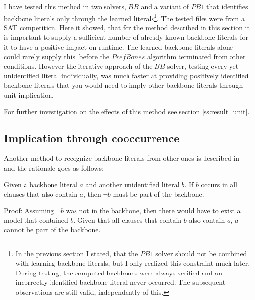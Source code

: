 I have tested this method in two solvers, $BB$ and a variant of $PB1$ that identifies backbone literals only through the learned literals\footnote{
	In the previous section I stated, that the $PB1$ solver should not be combined with learning backbone literals, but I only realized this constraint much later. During testing, the computed backbones were always verified and an incorrectly identified backbone literal never occurred. The subsequent observations are still valid, independently of this.}.
The tested files were from a SAT competition. Here it showed, that for the method described in this section it is important to supply a sufficient number of already known backbone literals for it to have a positive impact on runtime. The learned backbone literals alone could rarely supply this, before the $PrefBones$ algorithm terminated from other conditions. However the iterative approach of the $BB$ solver, testing every yet unidentified literal individually, was much faster at providing positively identified backbone literals that you would need to imply other backbone literals through unit implication.


For further investigation on the effects of this method see section \ref{ss:result_unit}.






\subsection{Implication through cooccurrence}
\label{subsec:coocc}

Another method to recognize backbone literals from other ones is described in \cite{wbxcl16} and the rationale goes as follows:

\begin{lemma}
Given a backbone literal $a$ and another unidentified literal $b$. If $b$ occurs in all clauses that also contain $a$, then $\neg b$ must be part of the backbone. 

Proof: Assuming $\neg b$ was not in the backbone, then there would have to exist a model that contained $b$. Given that all clauses that contain $b$ also contain $a$, $a$ cannot be part of the backbone.
\end{lemma}

